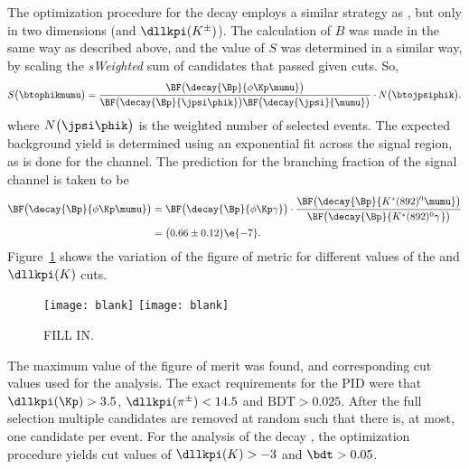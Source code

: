The optimization procedure for the decay \btophikmumu employs a similar strategy as \btokpipimumu,
but only in two dimensions  (\BDT and $\dllkpi(K^\pm)$).
The calculation of $B$ was made in the same way as described above, and the
value of $S$ was determined in a similar way, by scaling the \emph{sWeighted} sum of candidates
that passed given cuts.
So,
\begin{equation}
  S\big(\btophikmumu\big) = \\
  \frac{
    \BF\big(\decay{\Bp}{\phi\Kp\mumu}\big)
  }{
    \BF\big(\decay{\Bp}{\jpsi\phik}\big)
    \BF\big(\decay{\jpsi}{\mumu}\big)
  }
  \cdot
  N\big(\btojpsiphik\big).
\end{equation}
where $N\big(\jpsi\phik\big)$ is the weighted number of selected \btojpsiphik events.
The expected background yield is determined using an exponential fit across the signal region, as
is done for the \btokpipimumu channel.
The prediction for the branching fraction of the signal channel is taken to be
\begin{align}
  \BF\big(\decay{\Bp}{\phi\Kp\mumu}\big)
  &=
  \BF\big(\decay{\Bp}{\phi\Kp\gamma}\big)
  \cdot\frac{
    \BF\big(\decay{\Bp}{K^*(892)^0\mumu}\big)
  }{
    \BF\big(\decay{\Bp}{K^*(892)^0\gamma^{}}\big)
  }\nonumber\\
  &=\big(0.66\pm0.12\big)\e{-7}.
\end{align}
Figure~\ref{fig:phik:opt} shows the variation of the figure of metric for different values of the
\bdt and $\dllkpi(K)$ cuts.

\begin{figure}
  \begin{center}
    \texttt{[image: blank]}
    \texttt{[image: blank]}
    \caption{\small
      FILL IN.
    }
    \label{fig:phik:opt}
  \end{center}
\end{figure}

The maximum value of the figure of merit was found, and corresponding cut values used for the
analysis.
The exact requirements for the PID were that $\dllkpi(\Kp)>3.5$, $\dllkpi(\pi^\pm)<14.5$ and
$\mathrm{BDT}>0.025$.
After the full selection multiple candidates are removed at random such that there is, at most, one
\btokpipimumu candidate per event.
For the analysis of the decay \btophikmumu, the optimization procedure yields cut values of
$\dllkpi(K)>-3$ and $\bdt>0.05$.

